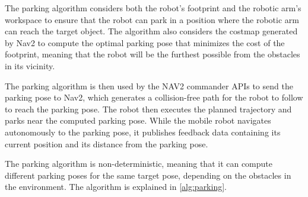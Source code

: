 The parking algorithm considers both the robot's footprint and the robotic arm's workspace to ensure that the
robot can park in a position where the robotic arm can reach the target object. 
The algorithm also considers the costmap generated by Nav2 to compute the optimal parking
pose that minimizes the cost of the footprint, meaning that the robot will be the furthest possible from
the obstacles in its vicinity. 

The parking algorithm is then used by the NAV2 commander APIs to send the parking pose to Nav2,
which generates a collision-free path for the robot to follow to reach the parking pose. The robot then executes
the planned trajectory and parks near the computed parking pose. While the mobile robot navigates
autonomously to the parking pose, it publishes feedback data containing its current position and its distance 
from the parking pose. 

The parking algorithm is non-deterministic, meaning that it can compute different parking poses for the same target
pose, depending on the obstacles in the environment. The algorithm is explained in \ref{alg:parking}.

